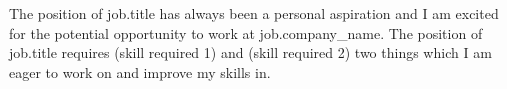 The position of {{job.title}} has always been a personal aspiration and I am excited for the potential opportunity to work at {{job.company_name}}. The position of {{job.title}} requires (skill required 1) and (skill required 2) two things which I am eager to work on and improve my skills in.
